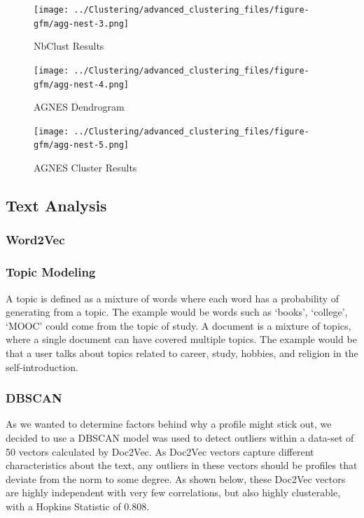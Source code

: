 \documentclass[]{article}
\begin{document}
\begin{figure}
\centering
\texttt{[image: ../Clustering/advanced\_clustering\_files/figure-gfm/agg-nest-3.png]}
\caption{NbClust Results}
\end{figure}

\begin{figure}
\centering
\texttt{[image: ../Clustering/advanced\_clustering\_files/figure-gfm/agg-nest-4.png]}
\caption{AGNES Dendrogram}
\end{figure}

\begin{figure}
\centering
\texttt{[image: ../Clustering/advanced\_clustering\_files/figure-gfm/agg-nest-5.png]}
\caption{AGNES Cluster Results}
\end{figure}

\hypertarget{text-analysis}{%
\subsection{Text Analysis}\label{text-analysis}}

\hypertarget{word2vec}{%
\subsubsection{Word2Vec}\label{word2vec}}

\hypertarget{topic-modeling}{%
\subsubsection{Topic Modeling}\label{topic-modeling}}

A topic is defined as a mixture of words where each word has a
probability of generating from a topic. The example would be words such
as `books', `college', `MOOC' could come from the topic of study. A
document is a mixture of topics, where a single document can have
covered multiple topics. The example would be that a user talks about
topics related to career, study, hobbies, and religion in the
self-introduction.

\hypertarget{dbscan}{%
\subsubsection{DBSCAN}\label{dbscan}}

As we wanted to determine factors behind why a profile might stick out,
we decided to use a DBSCAN model was used to detect outliers within a
data-set of 50 vectors calculated by Doc2Vec. As Doc2Vec vectors capture
different characteristics about the text, any outliers in these vectors
should be profiles that deviate from the norm to some degree. As shown
below, these Doc2Vec vectors are highly independent with very few
correlations, but also highly clusterable, with a Hopkins Statistic of
0.808.
\end{document}
